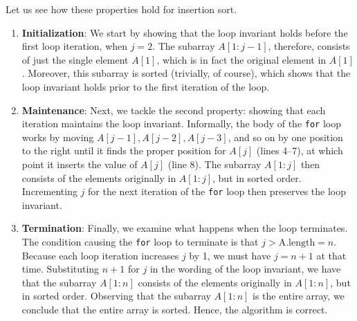 \documentclass{report}
\begin{document}
    \bigbreak \noindent 
    Let us see how these properties hold for insertion sort.
    \begin{enumerate}
        \item \textbf{Initialization}: We start by showing that the loop invariant holds before the first loop iteration, when \( j = 2 \). The subarray \( A[1 : j - 1] \), therefore, consists of just the single element \( A[1] \), which is in fact the original element in \( A[1] \). Moreover, this subarray is sorted (trivially, of course), which shows that the loop invariant holds prior to the first iteration of the loop.
        \item \textbf{Maintenance}:  Next, we tackle the second property: showing that each iteration maintains the loop invariant. Informally, the body of the \texttt{for} loop works by moving $A[j - 1], A[j - 2], A[j - 3]$, and so on by one position to the right until it finds the proper position for $A[j]$ (lines 4--7), at which point it inserts the value of $A[j]$ (line 8). The subarray $A[1 : j]$ then consists of the elements originally in $A[1 : j]$, but in sorted order. Incrementing $j$ for the next iteration of the \texttt{for} loop then preserves the loop invariant.
        \item \textbf{Termination}: Finally, we examine what happens when the loop terminates. The condition causing the \texttt{for} loop to terminate is that \( j > \text{A.length} = n \). Because each loop iteration increases \( j \) by 1, we must have \( j = n + 1 \) at that time. 
            \bigbreak \noindent 
            Substituting \( n + 1 \) for \( j \) in the wording of the loop invariant, we have that the subarray \( A[1 : n] \) consists of the elements originally in \( A[1 : n] \), but in sorted order. Observing that the subarray \( A[1 : n] \) is the entire array, we conclude that the entire array is sorted. Hence, the algorithm is correct.
    \end{enumerate}
    \bigbreak \noindent 
\end{document}
